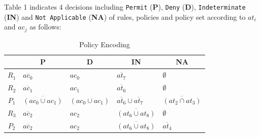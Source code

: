 Table 1 indicates 4 decisions including \texttt{Permit} (\textbf{P}), \texttt{Deny} (\textbf{D}), \texttt{Indeterminate} (\textbf{IN}) and \texttt{Not Applicable} (\textbf{NA}) of rules, policies and policy set according to $at_i$ and $ac_j$ as follows:

\begin{table}[!ht]
\centering
\caption{Policy Encoding}
\label{table:policy-encoding}
\begin{tabular}{|c|l|l|l|l|}
\hline
            & \multicolumn{1}{c|}{\textbf{P}} & \multicolumn{1}{c|}{\textbf{D}} & \multicolumn{1}{c|}{\textbf{IN}} & \multicolumn{1}{c|}{\textbf{NA}} \\ \hline
\textbf{$R_1$} & $\overline{ac_0}$                                    & $ac_0$                                  & $\overline{at_7}$                                           &  $\emptyset$                                            \\ \hline
\textbf{$R_2$} & $\overline{ac_1}$                                    & $ac_1$                                  & $\overline{at_6}$                                           & $\emptyset$                                            \\ \hline
\textbf{$P_1$} & $\overline{(ac_0 \cup ac_1)}$                                    & $(ac_0 \cup ac_1)$                                  & $\overline{at_6} \cup \overline{at_7}$                                           & $\overline{(at_2 \cap at_3)}$                                            \\ \hline
\textbf{$R_3$} & $\overline{ac_2}$                                    & $ac_2$                                  & $\overline{(at_6 \cup at_8)}$                                           & $\emptyset$                                            \\ \hline
\textbf{$P_2$} & $\overline{ac_2}$                                    & $ac_2$                                  & $\overline{(at_6 \cup at_8)}$                                           & $\overline{at_4}$                                            \\ \hline

\end{tabular}
\end{table}
